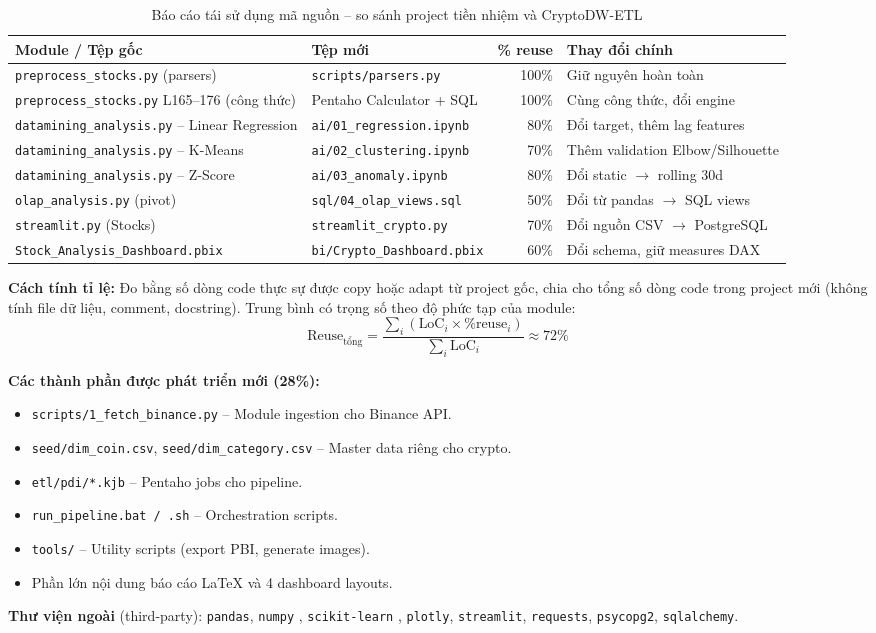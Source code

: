 \begin{table}[H]
\centering
\caption{Báo cáo tái sử dụng mã nguồn -- so sánh project tiền nhiệm và CryptoDW-ETL}
\label{tab:reuse}
\small
\begin{tabular}{@{}llrl@{}}
\toprule
\textbf{Module / Tệp gốc} & \textbf{Tệp mới} & \textbf{\% reuse} & \textbf{Thay đổi chính} \\
\midrule
\texttt{preprocess\_stocks.py} (parsers)
    & \texttt{scripts/parsers.py}             & 100\% & Giữ nguyên hoàn toàn \\
\texttt{preprocess\_stocks.py} L165--176 (công thức)
    & Pentaho Calculator + SQL                & 100\% & Cùng công thức, đổi engine \\
\texttt{datamining\_analysis.py} -- Linear Regression
    & \texttt{ai/01\_regression.ipynb}        &  80\% & Đổi target, thêm lag features \\
\texttt{datamining\_analysis.py} -- K-Means
    & \texttt{ai/02\_clustering.ipynb}        &  70\% & Thêm validation Elbow/Silhouette \\
\texttt{datamining\_analysis.py} -- Z-Score
    & \texttt{ai/03\_anomaly.ipynb}           &  80\% & Đổi static $\to$ rolling 30d \\
\texttt{olap\_analysis.py} (pivot)
    & \texttt{sql/04\_olap\_views.sql}        &  50\% & Đổi từ pandas $\to$ SQL views \\
\texttt{streamlit.py} (Stocks)
    & \texttt{streamlit\_crypto.py}           &  70\% & Đổi nguồn CSV $\to$ PostgreSQL \\
\texttt{Stock\_Analysis\_Dashboard.pbix}
    & \texttt{bi/Crypto\_Dashboard.pbix}      &  60\% & Đổi schema, giữ measures DAX \\
\bottomrule
\end{tabular}
\end{table}

\textbf{Cách tính tỉ lệ:} Đo bằng số dòng code thực sự được copy hoặc adapt từ project gốc, chia cho tổng số dòng code trong project mới (không tính file dữ liệu, comment, docstring). Trung bình có trọng số theo độ phức tạp của module:
\[
\text{Reuse}_{\text{tổng}} = \frac{\sum_i (\text{LoC}_i \times \%\text{reuse}_i)}{\sum_i \text{LoC}_i} \approx 72\%
\]

\textbf{Các thành phần được phát triển mới (28\%):}
\begin{itemize}
    \item \texttt{scripts/1\_fetch\_binance.py} -- Module ingestion cho Binance API.
    \item \texttt{seed/dim\_coin.csv}, \texttt{seed/dim\_category.csv} -- Master data riêng cho crypto.
    \item \texttt{etl/pdi/*.kjb} -- Pentaho jobs cho pipeline.
    \item \texttt{run\_pipeline.bat / .sh} -- Orchestration scripts.
    \item \texttt{tools/} -- Utility scripts (export PBI, generate images).
    \item Phần lớn nội dung báo cáo LaTeX và 4 dashboard layouts.
\end{itemize}

\textbf{Thư viện ngoài} (third-party): \texttt{pandas}, \texttt{numpy} \cite{mckinney2017}, \texttt{scikit-learn} \cite{scikit2023}, \texttt{plotly}, \texttt{streamlit}, \texttt{requests}, \texttt{psycopg2}, \texttt{sqlalchemy}.
